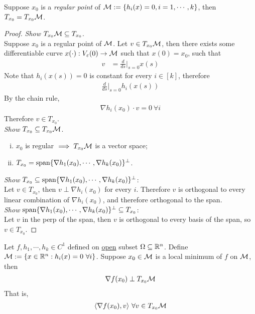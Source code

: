 \documentclass{article}
\begin{document}
   	\begin{theorem}
   		Suppose $x_0$ is a \emph{regular point} of $\mathcal{{M}} := \{h_i(x) = 0, i=1,\cdots,k\}$, then $T_{x_0} = T_{x_0} \mathcal{{M}}$.
   	\end{theorem}
   	
   	\begin{proof}
   		\emph{Show} $T_{x_0} \mathcal{{M}} \subseteq T_{x_0}$.\\
   		Suppose $x_0$ is a regular point of $\mathcal{{M}}$.
   		Let $v \in T_{x_0} \mathcal{{M}}$, then there exists some differentiable curve $x(\cdot):V_\varepsilon(0) \to \mathcal{{M}}$ such that $x(0) = x_0$, such that
   		\begin{align}
   			v &= \frac{d}{ds} \bigg \vert_{s=0} x(s)
   		\end{align}
   		Note that $h_i(x(s)) = 0$ is constant for every $i \in [k]$, therefore
   		\begin{align}
   			\frac{d}{ds} \bigg \vert_{s=0} h_i(x(s))
   		\end{align}
   		By the chain rule, 
   		\begin{align}
   			\nabla h_i(x_0)\cdot v = 0\ \forall i
   		\end{align}
   		Therefore $v \in T_{x_0}$. \\
   		\emph{Show} $T_{x_0} \subseteq T_{x_0} \mathcal{{M}}$.
   		\begin{enumerate}[(i)]
   			\item $x_0$ is regular $\implies T_{x_0} \mathcal{{M}}$ is a vector space;
   			\item $T_{x_0} = \text{{span}}\{\nabla h_1 (x_0), \cdots, \nabla h_k(x_0)\}^\perp$.
   		\end{enumerate}
   		\emph{Show} $T_{x_0} \subseteq \text{{span}}\{\nabla h_1 (x_0), \cdots, \nabla h_k(x_0)\}^\perp$: \\
   		Let $v \in T_{x_0}$, then $v \perp \nabla h_i(x_0)$ for every $i$. Therefore $v$ is orthogonal to every linear combination of $\nabla h_i(x_0)$, and therefore orthogonal to the span.\\
   		\emph{Show} $\text{{span}}\{\nabla h_1 (x_0), \cdots, \nabla h_k(x_0)\}^\perp \subseteq T_{x_0}$: \\
   		Let $v$ in the perp of the span, then $v$ is orthogonal to every basis of the span, so $v \in T_{x_0}$.
   	\end{proof}
   	
   	\begin{lemma}
   		Let $f, h_1, \cdots, h_k \in C^1$ defined on \ul{open} subset $\Omega \subseteq \mathbb{R}^n$. Define $\mathcal{{M}} := \{x \in \mathbb{R}^n: h_i(x) = 0\ \forall i \}$. Suppose $x_0 \in \mathcal{{M}}$ is a local minimum of $f$ on $\mathcal{{M}}$, then 
   		\begin{align}
   			\nabla f(x_0) \perp T_{x_0} \mathcal{{M}}
   		\end{align}
   		That is,
   		\begin{align}
   			\langle {\nabla f(x_0)}, {v} \rangle \ \forall v \in T_{x_0}\mathcal{{M}}
   		\end{align}
   	\end{lemma}
   	
\end{document}
